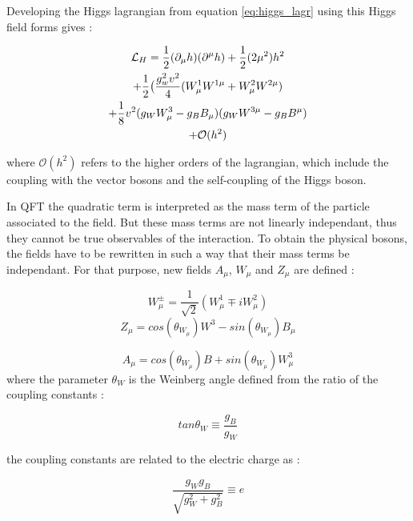 Developing the Higgs lagrangian from equation \ref{eq:higgs_lagr} using this Higgs field forms gives :

\begin{multline}
    \mathcal{L}_H = \frac{1}{2}(\partial_{\mu}h)(\partial^{\mu}h) + \frac{1}{2}(2\mu^2 )h^2 \\ + \frac{1}{2} \big( \frac{g^{2}_w v^2}{4} (W_{\mu}^1 W^{1\mu} + W_{\mu}^2 W^{2\mu}) \\ + \frac{1}{8} v^2 (g_W W_{\mu}^3 - g_B B_{\mu})(g_W W^{3\mu} - g_B B^{\mu}) \\ + \mathcal{O}(h^2)
    \label{eq:hlagr}
\end{multline}

where $\mathcal{O}(h^2)$ refers to the higher orders of the lagrangian, which include the coupling with the vector bosons and the self-coupling of the Higgs boson.

In QFT the quadratic term is interpreted as the mass term of the particle associated to the field. But these mass terms are not linearly independant, thus they cannot be true observables of the interaction. To obtain the physical bosons, the fields have to be rewritten in such a way that their mass terms be independant. For that purpose, new fields $A_{\mu}$, $W_{\mu}$ and $Z_{\mu}$ are defined :

\begin{equation}
    W^{\pm}_\mu = \frac{1}{\sqrt{2}}(W_{\mu}^1 \mp iW_{\mu}^2)
\end{equation}
\begin{equation}
    Z_{\mu} = cos(\theta_{W_{\mu}})W^3 - sin(\theta_{W_{\mu}})B_{\mu}
\end{equation}

\begin{equation}
    A_{\mu} = cos(\theta_{W_{\mu}})B + sin(\theta_{W_{\mu}})W_{\mu}^3
\end{equation}
where the parameter $\theta_W$ is the Weinberg angle \cite{GLASHOW1961579} defined from the ratio of the coupling constants :

\begin{equation}
    tan \theta_W \equiv \frac{g_B}{g_W}
\end{equation}

the coupling constants are related to the electric charge as :

\begin{equation}
    \frac{g_W g_B}{\sqrt{g_{W}^2 + g^{2}_B}} \equiv e
\end{equation}

